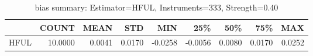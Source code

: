 \begin{table}[ht]
\centering
\caption{bias summary: Estimator=HFUL, Instruments=333, Strength=0.40}
\begin{tabular}{lrrrrrrrr}
\toprule
 & COUNT & MEAN & STD & MIN & 25\% & 50\% & 75\% & MAX \\
\midrule
HFUL & 10.0000 & 0.0041 & 0.0170 & -0.0258 & -0.0056 & 0.0080 & 0.0170 & 0.0252 \\
\bottomrule
\end{tabular}
\end{table}
